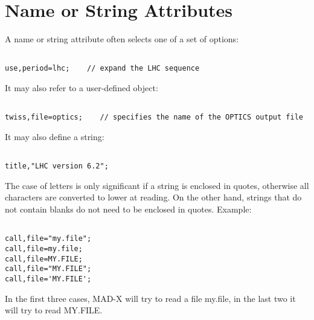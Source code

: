 
\section{Name or String Attributes}

A name or string attribute often selects one of a set of options: 
\begin{verbatim}

use,period=lhc;    // expand the LHC sequence
\end{verbatim} 

It may also refer to a user-defined object: 
\begin{verbatim}

twiss,file=optics;    // specifies the name of the OPTICS output file
\end{verbatim} 

It may also define a string: 
\begin{verbatim}

title,"LHC version 6.2";
\end{verbatim} 

The case of letters is only significant if a string is enclosed in
quotes, otherwise all characters are converted to lower at reading. On
the other hand, strings that do not contain blanks do not need to be
enclosed in quotes. Example:
\begin{verbatim}

call,file="my.file";
call,file=my.file;
call,file=MY.FILE;
call,file="MY.FILE";
call,file='MY.FILE';
\end{verbatim} 
In the first three cases, MAD-X will try to read a file my.file, in the
last two it will try to read MY.FILE.  

